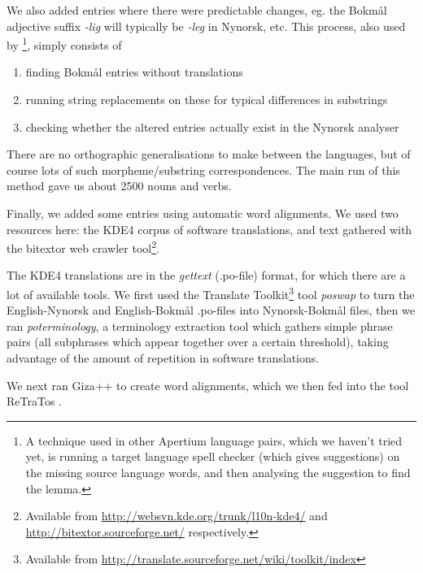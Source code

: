 \documentclass[11pt]{article}
\begin{document}
We also added entries where there were predictable changes, eg. the
Bokmål adjective suffix \emph{-lig} will typically be \emph{-leg} in Nynorsk,
etc. This process, also used by \citet[p.~4]{tyers2009dpm}\footnote{A technique used in other Apertium language pairs, which we
haven't tried yet, is running a target language spell checker (which
gives suggestions) on the missing source language words, and then
analysing the suggestion to find the lemma. },
simply consists of
\begin{enumerate}
\item finding Bokmål entries without translations
\item running string replacements on these for typical differences in
   substrings
\item checking whether the altered entries actually exist in the Nynorsk
   analyser
\end{enumerate}
There are no orthographic generalisations to make between the
languages, but of course lots of such morpheme/substring
correspondences. The main run of this method gave us about 2500 nouns
and verbs.

Finally, we added some entries using automatic word alignments. We
used two resources here: the KDE4 corpus of software translations, and
text gathered with the bitextor web crawler tool\footnote{Available from \href{http://websvn.kde.org/trunk/l10n-kde4/}{http://websvn.kde.org/trunk/l10n-kde4/} and
\href{http://bitextor.sourceforge.net/}{http://bitextor.sourceforge.net/} respectively. }. 

The KDE4 translations are in the \emph{gettext} (.po-file) format, for
which there are a lot of available tools. We first used the Translate
Toolkit\footnote{Available from
\href{http://translate.sourceforge.net/wiki/toolkit/index}{http://translate.sourceforge.net/wiki/toolkit/index} } tool \emph{poswap} to turn the English-Nynorsk and
English-Bokmål .po-files into Nynorsk-Bokmål files, then we ran
\emph{poterminology}, a terminology extraction tool which gathers simple
phrase pairs (all subphrases which appear together over a certain
threshold), taking advantage of the amount of repetition in software
translations. 

We next ran Giza++ \citep{och2003scv} to create word alignments, which
we then fed into the tool ReTraTos \citep{caseli2006aib}.
\end{document}
